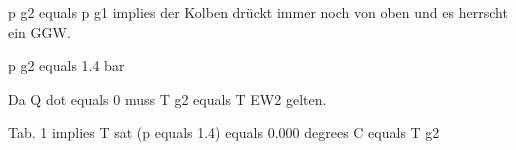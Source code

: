 p g2 equals p g1 implies der Kolben drückt immer noch von oben und es herrscht ein GGW.  

p g2 equals 1.4 bar  

Da Q dot equals 0 muss T g2 equals T EW2 gelten.  

Tab. 1 implies T sat (p equals 1.4) equals 0.000 degrees C equals T g2